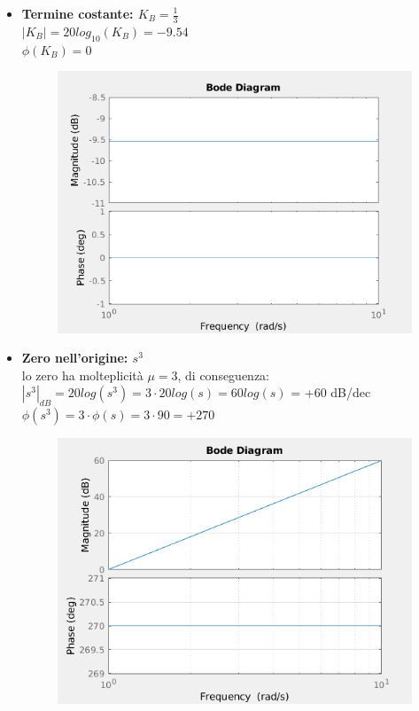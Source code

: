 \documentclass[12pt,a4paper]{article}
\begin{document}
	\begin{itemize}
		\item \textbf{Termine costante: $K_B = \frac{1}{3}$}\vspace{5px}\\
		$|K_B| = 20log_{10}(K_B) = -9.54$\\
		$\phi(K_B) = 0$\degree
		\begin{figure}[h!]
			\centering
			\includegraphics[scale=0.5]{./images/bode42_1.png}
		\end{figure}
		\newpage
		\item \textbf{Zero nell'origine: $s^3$}\vspace{5px}\\
		lo zero ha molteplicit\`a $\mu = 3$, di conseguenza:\\
		$|s^3|_{dB} = 20log(s^3) = 3 \cdot 20log(s) = 60log(s)$ = +60 dB/dec\\
		$\phi(s^3) = 3 \cdot \phi(s)= 3 \cdot 90$\degree $= +270$\degree
		\begin{figure}[h!]
			\centering
			\includegraphics[scale=0.5]{./images/bode42_2.png}

\end{figure}
\end{itemize}
\end{document}
